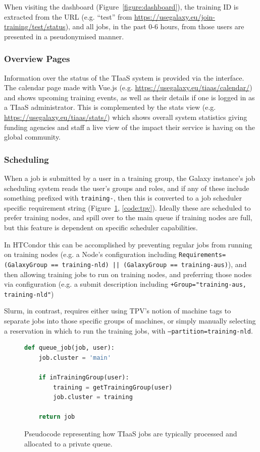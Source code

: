 When visiting the dashboard (Figure~\ref{figure:dashboard}), the training ID is extracted from the URL (e.g. ``test'' from \url{https://usegalaxy.eu/join-training/test/status}), and all jobs, in the past 0-6 hours, from those users are presented in a pseudonymised manner.

\subsubsection*{Overview Pages}
Information over the status of the TIaaS system is provided via the interface. The calendar page made with Vue.js \cite{Vue} (e.g. \url{https://usegalaxy.eu/tiaas/calendar/}) and shows upcoming training events, as well as their details if one is logged in as a TIaaS administrator. This is complemented by the stats view (e.g. \url{https://usegalaxy.eu/tiaas/stats/}) which shows overall system statistics giving funding agencies and staff a live view of the impact their service is having on the global community.

\subsubsection*{Scheduling}
When a job is submitted by a user in a training group, the Galaxy instance's job scheduling system reads the user's groups and roles, and if any of these include something prefixed with \texttt{training-}, then this is converted to a job scheduler specific requirement string (Figure~\ref{code:scheduler}, \ref{code:tpv}). Ideally these are scheduled to prefer training nodes, and spill over to the main queue if training nodes are full, but this feature is dependent on specific scheduler capabilities.

In HTCondor this can be accomplished by preventing regular jobs from running on training nodes (e.g. a Node's configuration including \texttt{Requirements=(GalaxyGroup == training-nld) || (GalaxyGroup == training-aus)}), and then allowing training jobs to run on training nodes, and preferring those nodes via configuration (e.g. a submit description including \texttt{+Group="training-aus, training-nld"})

Slurm, in contrast, requires either using TPV's notion of machine tags to separate jobs into those specific groups of machines, or simply manually selecting a reservation in which to run the training jobs, with \texttt{--partition=training-nld}.

\begin{figure}[!ht]
\centering
\begin{lstlisting}[frame=single,language=Python]
def queue_job(job, user):
    job.cluster = 'main'

    if inTrainingGroup(user):
        training = getTrainingGroup(user)
        job.cluster = training

    return job
\end{lstlisting}
\caption{Pseudocode representing how TIaaS jobs are typically processed and allocated to a private queue.\label{code:scheduler}}
\end{figure}

